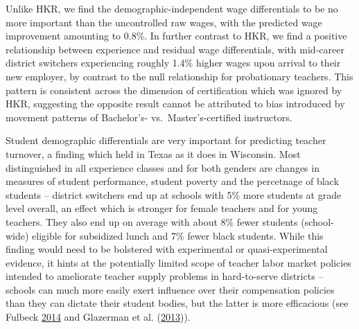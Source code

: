 \documentclass[12pt,]{article}
\begin{document}
Unlike HKR, we find the demographic-independent wage differentials to be
no more important than the uncontrolled raw wages, with the predicted
wage improvement amounting to 0.8\%. In further contrast to HKR, we find
a positive relationship between experience and residual wage
differentials, with mid-career district switchers experiencing roughly
1.4\% higher wages upon arrival to their new employer, by contrast to
the null relationship for probationary teachers. This pattern is
consistent across the dimension of certification which was ignored by
HKR, suggesting the opposite result cannot be attributed to bias
introduced by movement patterns of Bachelor's- vs.~Master's-certified
instructors.

Student demographic differentials are very important for predicting
teacher turnover, a finding which held in Texas as it does in Wisconsin.
Most distinguished in all experience classes and for both genders are
changes in measures of student performance, student poverty and the
percetnage of black students -- district switchers end up at schools
with 5\% more students at grade level overall, an effect which is
stronger for female teachers and for young teachers. They also end up on
average with about 8\% fewer students (school-wide) eligible for
subsidized lunch and 7\% fewer black students. While this finding would
need to be bolstered with experimental or quasi-experimental evidence,
it hints at the potentially limited scope of teacher labor market
policies intended to ameliorate teacher supply problems in hard-to-serve
districts -- schools can much more easily exert influence over their
compensation policies than they can dictate their student bodies, but
the latter is more efficacious (see Fulbeck
\protect\hyperlink{ref-fulbeck}{2014} and Glazerman et al.
(\protect\hyperlink{ref-glazerman}{2013})).
\end{document}
